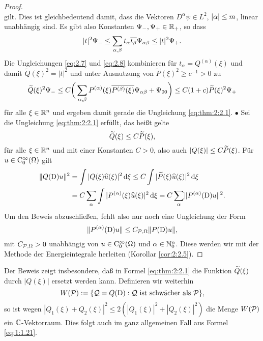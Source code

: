 \begin{proof}
\begin{equation}
\end{equation}
gilt.
Dies ist gleichbedeutend damit,
dass die Vektoren $D^\alpha\psi\in L^2$, $\lvert\alpha\rvert\leq m$, linear unabhängig sind.
Es gibt also Konstanten $\Psi_-,\Psi_+\in\mathbb R_+$, so dass
\begin{equation}\label{eq:2.8}
\lvert t\rvert^2\Psi_-\leq\sum_{\alpha,\beta}t_\alpha \overline{t_\beta}\Psi_{\alpha\beta}\leq\lvert t\rvert^2\Psi_+.
\end{equation}
Die Ungleichungen \eqref{eq:2.7} und \eqref{eq:2.8} kombinieren für $t_\alpha=Q^{(\alpha)}(\xi)$ und damit $\widetilde Q(\xi)^2=|t|^2$ 
und unter Ausnutzung von $\widetilde P(\xi)^2\ge c^{-1}>0$ zu
\begin{equation}\label{eq:2.9}
\widetilde{Q}(\xi)^2 \Psi_- \le C  \bigg(\sum_{\alpha,\beta}P^{(\alpha)}(\xi)\overline{{P}^{(\beta)}(\xi)}\Psi_{\alpha\beta}+\Psi_{00}\bigg) \leq  C(1+c) \widetilde{P}(\xi)^2 \Psi_+
\end{equation}
für alle $\xi\in\mathbb R^n$ und ergeben damit gerade die Ungleichung \eqref{eq:thm:2:2.1}.
%
$\bullet$
Sei die Ungleichung \eqref{eq:thm:2:2.1} erfüllt, das heißt gelte
\begin{equation}\label{eq:2.10}
\widetilde{Q}(\xi)\leq C\widetilde{P}(\xi),
\end{equation}
für alle $\xi\in\mathbb R^n$ und mit einer Konstanten $C>0$,
also auch $\lvert Q(\xi)\rvert\leq C\widetilde{P}(\xi)$.
Für $u\in\mathrm C_0^\infty(\Omega)$ gilt
\begin{align}
\|Q(\mathrm D) u\|^2 &= \int |Q(\xi) \widehat{u}(\xi)|^2 \,\mathrm d\xi
\leq C \int |\widetilde P(\xi) \widehat{u}(\xi)|^2 \,\mathrm d\xi \notag\\&  = C\sum_\alpha\int | P^{(\alpha)}(\xi)\widehat{u}(\xi)|^2\,\mathrm d\xi = C\sum_\alpha\lVert P^{(\alpha)}(\mathrm D)u\rVert^2.\label{eq:2.11}
\end{align}
Um den Beweis abzuschließen,
fehlt also nur noch eine Ungleichung der Form
\begin{equation}
\lVert P^{(\alpha)}(\mathrm D)u\rVert\leq C_{\mathcal P,\Omega}\lVert P(\mathrm D)u\rVert, \label{eq:2:wantedineq}
\end{equation}
mit $C_{\mathcal P,\Omega}>0$ unabhängig von $u\in\mathrm C_0^\infty(\Omega)$ und $\alpha\in\mathbb N_0^n$. Diese werden wir mit der Methode der Energieintegrale herleiten (Korollar \ref{cor:2:2.5}).
\end{proof}

\begin{rem}
Der Beweis zeigt insbesondere, daß in Formel \eqref{eq:thm:2:2.1} die Funktion $\widetilde{Q}(\xi)$ durch $|Q(\xi)|$ ersetzt werden kann.
Definieren wir weiterhin
\begin{equation}
W(\mathcal P):=\{\mathcal Q=Q(\mathrm D):\mathcal Q~\text{ist schwächer als}~\mathcal P\},
\end{equation}
so ist wegen $|Q_1(\xi)+Q_2(\xi)|^2\leq2(|Q_1(\xi)|^2+|Q_2(\xi)|^2)$
die Menge $W(\mathcal P)$ ein $\mathbb C$-Vektorraum.
Dies folgt auch im ganz allgemeinen Fall aus Formel \eqref{eq:1:1.21}.
\end{rem}

